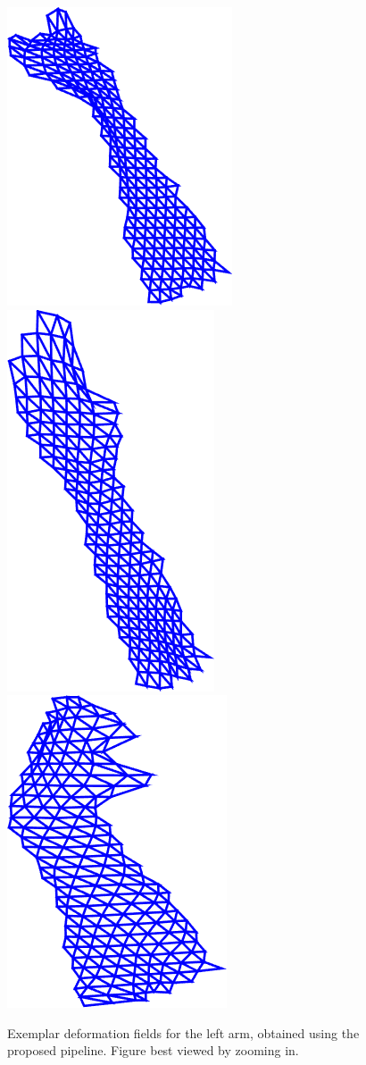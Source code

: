 \begin{figure}[t!]
    \includegraphics[height=\flowh]{resources/Fig_Flows/4}
    \includegraphics[height=\flowh]{resources/Fig_Flows/5}
    \includegraphics[height=\flowh]{resources/Fig_Flows/6}
    \caption{Exemplar deformation fields for the left arm, obtained using the proposed pipeline. Figure best viewed by zooming in.}
    \label{fig:deformationfield}
\end{figure}

